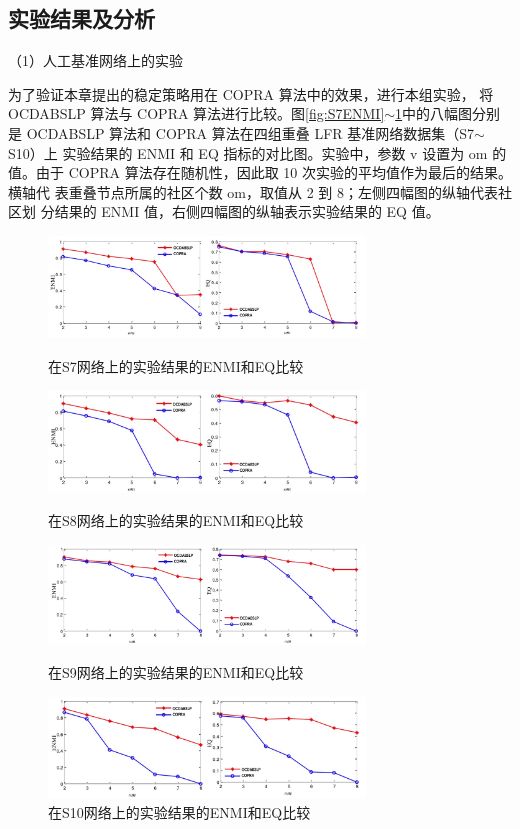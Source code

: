 \subsection{实验结果及分析}

（1）人工基准网络上的实验

为了验证本章提出的稳定策略用在 COPRA 算法中的效果，进行本组实验，
将 OCDABSLP 算法与 COPRA 算法进行比较。图\ref{fig:S7ENMI}$\sim$\ref{fig:S10ENMI}中的八幅图分别是
OCDABSLP 算法和 COPRA 算法在四组重叠 LFR 基准网络数据集（S7$\sim$S10）上
实验结果的 ENMI 和 EQ 指标的对比图。实验中，参数 v 设置为 om 的值。由于
COPRA 算法存在随机性，因此取 10 次实验的平均值作为最后的结果。横轴代
表重叠节点所属的社区个数 om，取值从 2 到 8；左侧四幅图的纵轴代表社区划
分结果的 ENMI 值，右侧四幅图的纵轴表示实验结果的 EQ 值。 

\begin{figure}
  \centering
  \includegraphics[width=0.75\textwidth]{figures/S7ENMI}
  \caption{在S7网络上的实验结果的ENMI和EQ比较}\label{fig:S7ENMI}

  \includegraphics[width=0.75\textwidth]{figures/S8ENMI}
  \caption{在S8网络上的实验结果的ENMI和EQ比较}\label{fig:S8ENMI}

  \includegraphics[width=0.75\textwidth]{figures/S9ENMI}
  \caption{在S9网络上的实验结果的ENMI和EQ比较}\label{fig:S9ENMI}

  \includegraphics[width=0.75\textwidth]{figures/S10ENMI}
  \caption{在S10网络上的实验结果的ENMI和EQ比较}\label{fig:S10ENMI}

\end{figure}

